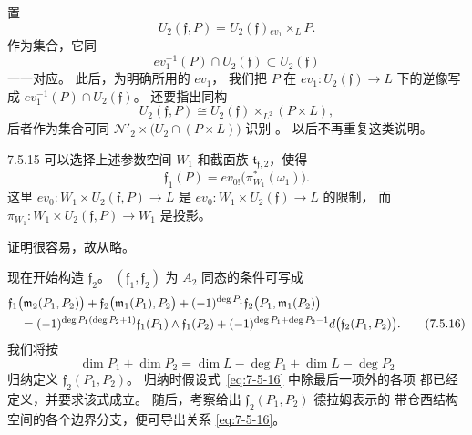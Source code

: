 置
\[
U_2(\mathfrak f,P)
=U_2(\mathfrak f){}_{ev_1}\!\mathbin{\times_L}P.
\]
作为集合，它同
\[
ev_1^{-1}(P)\cap U_2(\mathfrak f)
\subset U_2(\mathfrak f)
\]
一一对应。
此后，为明确所用的 $ev_1$，
我们把 $P$ 在 $ev_1\colon U_2(\mathfrak f)\to L$
下的逆像写成 $ev_1^{-1}(P)\cap U_2(\mathfrak f)$。
还要指出同构
\[
U_2(\mathfrak f,P)
\cong U_2(\mathfrak f)
\mathbin{\times_{L^2}}(P\times L),
\]
后者作为集合可同
$\mathcal N'_2\times\bigl(U_2\cap(P\times L)\bigr)$ 识别
。
以后不再重复这类说明。

\begin{lemma}{7.5.15}\label{lem:7-5-15}
可以选择上述参数空间 $W_1$ 和截面族
$\mathfrak t_{\mathfrak f,2}$，使得
\[
\mathfrak f_1(P)
=ev_{0!}\bigl(\pi_{W_1}^*(\omega_1)\bigr).
\]
这里
$ev_0\colon W_1\times U_2(\mathfrak f,P)\to L$
是 $ev_0\colon W_1\times U_2(\mathfrak f)\to L$ 的限制，
而
$\pi_{W_1}\colon W_1\times U_2(\mathfrak f,P)\to W_1$
是投影。
\end{lemma}

证明很容易，故从略。

现在开始构造 $\mathfrak f_2$。
$(\mathfrak f_1,\mathfrak f_2)$ 为 $A_2$ 同态的条件可写成
\begin{align}
&\mathfrak f_1\bigl(\mathfrak m_2(P_1,P_2)\bigr)
+\mathfrak f_2\bigl(\mathfrak m_1(P_1),P_2\bigr)
+(-1)^{\deg P_1}
 \mathfrak f_2\bigl(P_1,\mathfrak m_1(P_2)\bigr)
\notag\\
&\quad={}
(-1)^{\deg P_1(\deg P_2+1)}
\mathfrak f_1(P_1)\wedge\mathfrak f_1(P_2)
+(-1)^{\deg P_1+\deg P_2-1}
d\bigl(\mathfrak f_2(P_1,P_2)\bigr).
\tag{7.5.16}\label{eq:7-5-16}
\end{align}
我们将按
\[
\dim P_1+\dim P_2
=\dim L-\deg P_1+\dim L-\deg P_2
\]
归纳定义 $\mathfrak f_2(P_1,P_2)$。
归纳时假设式~\eqref{eq:7-5-16} 中除最后一项外的各项
都已经定义，并要求该式成立。
随后，考察给出 $\mathfrak f_2(P_1,P_2)$ 德拉姆表示的
带仓西结构空间的各个边界分支，便可导出关系
\eqref{eq:7-5-16}。


